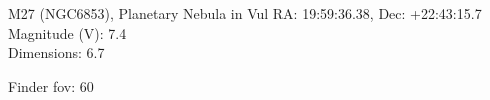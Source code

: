 \begin{block}{M27 (NGC6853), Planetary Nebula in Vul}
    RA: 19:59:36.38, Dec: +22:43:15.7 \\ 
    Magnitude (V): 7.4 \\ 
    Dimensions: 6.7 

    Finder fov: 60 
\end{block}